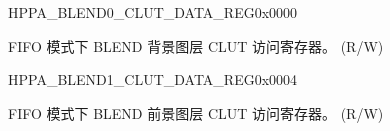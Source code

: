 \begin{register}{H}{PPA\_BLEND0\_CLUT\_DATA\_REG}{0x0000}\label{regdesc:PPABLEND0CLUTDATAREG}
%
\regnewline%
\begin{regdesc}\begin{reglist}
\label{fielddesc:PPARDWRWORDBLEND0CLUT}\item [PPA\_RDWR\_WORD\_BLEND0\_CLUT] FIFO 模式下 BLEND 背景图层 CLUT 访问寄存器。 (R/W)
\end{reglist}\end{regdesc}
\end{register}


\begin{register}{H}{PPA\_BLEND1\_CLUT\_DATA\_REG}{0x0004}\label{regdesc:PPABLEND1CLUTDATAREG}
%
\regnewline%
\begin{regdesc}\begin{reglist}
\label{fielddesc:PPARDWRWORDBLEND1CLUT}\item [PPA\_RDWR\_WORD\_BLEND1\_CLUT] FIFO 模式下 BLEND 前景图层 CLUT 访问寄存器。 (R/W)
\end{reglist}\end{regdesc}
\end{register}



